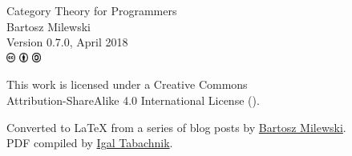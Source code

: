 \vspace*{\fill}
\thispagestyle{empty}

\begin{small}
\begin{center}

\noindent
Category Theory for Programmers\\

\vspace{1.0em}
\noindent
Bartosz Milewski\\

\vspace{1.26em}
\noindent
Version 0.7.0, April 2018\\

\vspace{1.6em}
\noindent
\includegraphics[width=3mm]{fig/icons/cc.pdf}
\includegraphics[width=3mm]{fig/icons/by.pdf}
\includegraphics[width=3mm]{fig/icons/sa.pdf}

\vspace{0.4em}
\noindent
This work is licensed under a Creative Commons\\
Attribution-ShareAlike 4.0 International License
(\href{http://creativecommons.org/licenses/by-sa/4.0/}{}).

\vspace{1.26em}
\noindent
Converted to \LaTeX{} from a series of blog posts by \href{https://bartoszmilewski.com/2014/10/28/category-theory-for-programmers-the-preface/}{Bartosz Milewski}.\\
PDF compiled by \href{https://github.com/hmemcpy/milewski-ctfp-pdf}{Igal Tabachnik}.\\

\end{center}
\end{small}